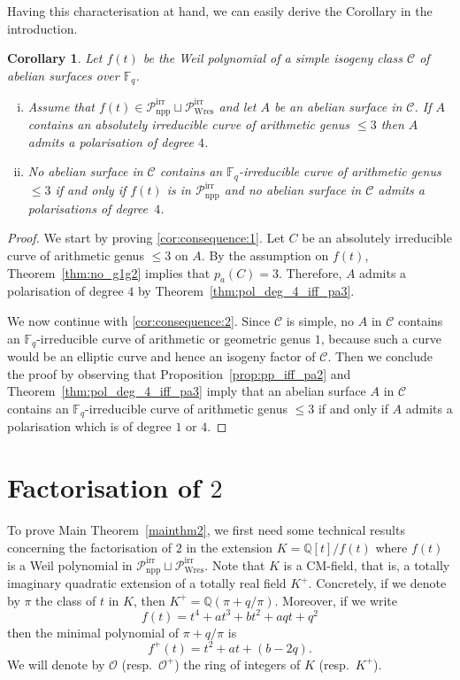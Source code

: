 \documentclass[11pt]{amsart}
\newcommand\Fq{\mathbb{F}_q}
\newcommand\Q{\mathbb{Q}}
\newcommand\cC{\mathcal{C}}
\newcommand\cO{\mathcal{O}}
\theoremstyle{plain}
\newtheorem{corollary}[theorem]{Corollary}
\theoremstyle{definition}
\newcommand\PirrA{\mathcal{P}^\mathrm{irr}_\mathrm{npp}}
\newcommand\PirrB{\mathcal{P}^\mathrm{irr}_\mathrm{Wres}}
\begin{document}
Having this characterisation at hand, we can easily derive the Corollary in the introduction.
\begin{corollary}\label{cor:consequence}
    Let $f(t)$ be the Weil polynomial of a simple isogeny class $\cC$ of abelian surfaces over $\Fq$.
    \begin{enumerate}[(i)]
        \item \label{cor:consequence:1} 
            Assume that $f(t)\in\PirrA\sqcup\PirrB$ and let $A$ be an abelian surface in $\cC$.
            If $A$ contains an absolutely irreducible curve of arithmetic genus $\leq 3$ then $A$ admits a polarisation of degree $4$.
        \item \label{cor:consequence:2}
            No abelian surface in $\cC$ contains an $\Fq$-irreducible curve of arithmetic genus $\leq 3$ if and only if $f(t)$ is in $\PirrA$ and no abelian surface in $\cC$ admits a polarisations of degree~$4$.
    \end{enumerate}   
\end{corollary}
\begin{proof}
    We start by proving \ref{cor:consequence:1}.
    Let $C$ be an absolutely irreducible curve of arithmetic genus $\leq 3$ on $A$.
    By the assumption on $f(t)$, Theorem~\ref{thm:no_g1g2} implies that $p_a(C)=3$. 
    Therefore, $A$ admits a polarisation of degree $4$ by Theorem~\ref{thm:pol_deg_4_iff_pa3}.

    We now continue with \ref{cor:consequence:2}.
    Since $\cC$ is simple, no $A$ in $\cC$ contains an $\Fq$-irreducible curve of arithmetic or geometric genus $1$, because such a curve would be an elliptic curve and hence an isogeny factor of $\cC$.
    Then we conclude the proof by observing that Proposition~\ref{prop:pp_iff_pa2} and Theorem~\ref{thm:pol_deg_4_iff_pa3} imply that an abelian surface $A$ in $\cC$ contains an $\Fq$-irreducible curve of arithmetic genus $\leq 3$ if and only if $A$ admits a polarisation which is of degree $1$ or $4$.
\end{proof}

\section{Factorisation of \texorpdfstring{$2$}{2}}
\label{sec:fact_of_2}

To prove Main Theorem~\ref{mainthm2}, we first need some technical results concerning the factorisation of $2$ in the extension $K = \Q[t]/f(t)$ where $f(t)$ is a Weil polynomial in $\PirrA\sqcup\PirrB$.
Note that $K$ is a CM-field, that is, a totally imaginary quadratic extension of a totally real field $K^+$.
Concretely, if we denote by $\pi$ the class of $t$ in $K$, then $K^+=\Q(\pi+q/\pi)$.
Moreover, if we write 
\[ f(t) = t^4+at^3+bt^2+aqt+q^2 \]
then the minimal polynomial of $\pi+q/\pi$ is 
\[ f^+(t) = t^2 + at + (b-2q). \]
We will denote by $\cO$ (resp.~$\cO^+$) the ring of integers of $K$ (resp.~$K^+$).
\end{document}
